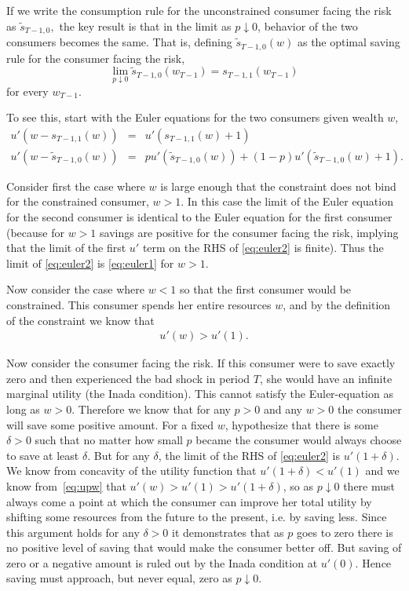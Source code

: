 If we write the consumption rule for the unconstrained consumer facing the risk as $\tilde{s}_{T-1,0},$ the key result is that in the limit as $p \downarrow 0$, behavior of the two consumers becomes the same. That is, defining $\tilde{s}_{T-1,0}(w)$ as the optimal saving rule for the consumer facing the risk,
\begin{equation*}
\lim_{p \downarrow 0} \tilde{s}_{T-1,0}(w_{T-1}) = s_{T-1,1}(w_{T-1}) \label{eq:lim0}
\end{equation*}
for every $w_{T-1}$.

To see this, start with the Euler equations for the two consumers given wealth $w$,
\begin{eqnarray}
u'(w-s_{T-1,1}(w)) & = & u'(s_{T-1,1}(w)+1) \label{eq:euler1}
\\   u'(w-\tilde{s}_{T-1,0}(w)) & = & p u'(\tilde{s}_{T-1,0}(w))+(1-p) u'(\tilde{s}_{T-1,0}(w)+1). \label{eq:euler2}
\end{eqnarray}

Consider first the case where $w$ is large enough that the constraint does not bind for the constrained consumer, $w>1$.  In this case the limit of the Euler equation for the second consumer is identical to the Euler equation for the first consumer (because for $w>1$ savings are positive for the consumer facing the risk, implying that the limit of the first $u'$ term on the RHS of \eqref{eq:euler2} is finite). Thus the limit of \eqref{eq:euler2} is \eqref{eq:euler1} for $w>1$.

Now consider the case where $w < 1$ so that the first consumer would be constrained.  This consumer spends her entire resources $w$, and by the definition of the constraint we know that
\begin{eqnarray}
u'(w) > u'(1). \label{eq:upw}
\end{eqnarray}

Now consider the consumer facing the risk. If this consumer were to save exactly zero and then experienced the bad shock in period $T$, she would have an infinite marginal utility (the Inada condition). This cannot satisfy the Euler-equation as long as $w>0$. Therefore we know that for any $p>0$ and any $w>0$ the consumer will save some positive amount. For a fixed $w$, hypothesize that there is some $\delta>0$ such that no matter how small $p$ became the consumer would always choose to save at least $\delta$. But for any $\delta$, the limit of the RHS of \eqref{eq:euler2} is $u'(1+\delta)$. We know from concavity of the utility function that $u'(1+\delta) < u'(1)$ and we know from~\eqref{eq:upw} that $u'(w) > u'(1) > u'(1+\delta)$, so as $p \downarrow 0$ there must always come a point at which the consumer can improve her total utility by shifting some resources from the future to the present, i.e. by saving less.  Since this argument holds for any $\delta>0$ it demonstrates that as $p$ goes to zero there is no positive level of saving that would make the consumer better off. But saving of zero or a negative amount is ruled out by the Inada condition at $u'(0)$.  Hence saving must approach, but never equal, zero as $p \downarrow 0$.


